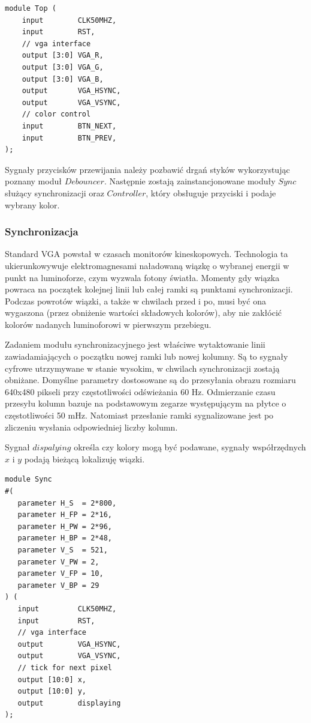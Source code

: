 \documentclass[a4paper,12pt]{article}
\begin{document}
\begin{lstlisting}[label=Topvga,caption=Top.v]
module Top (
    input        CLK50MHZ,
    input        RST,
    // vga interface
    output [3:0] VGA_R,
    output [3:0] VGA_G,
    output [3:0] VGA_B,
    output       VGA_HSYNC,
    output       VGA_VSYNC,
    // color control
    input        BTN_NEXT,
    input        BTN_PREV,
);
\end{lstlisting}

Sygnały przycisków przewijania należy pozbawić drgań styków wykorzystując poznany moduł $Debouncer$. Następnie zostają zainstancjonowane moduły $Sync$ służący synchronizacji oraz $Controller$, który obsługuje przyciski i podaje wybrany kolor.

\subsubsection{Synchronizacja}
Standard VGA powstał w czasach monitorów kineskopowych. Technologia ta ukierunkowywuje elektromagnesami naładowaną wiązkę o wybranej energii w punkt na luminoforze, czym wyzwala fotony światła. Momenty gdy wiązka powraca na początek kolejnej linii lub całej ramki są punktami synchronizacji. Podczas powrotów wiązki, a także w chwilach przed i po, musi być ona wygaszona (przez obniżenie wartości składowych kolorów), aby nie zakłócić kolorów nadanych luminoforowi w pierwszym przebiegu.

Zadaniem modułu synchronizacyjnego jest właściwe wytaktowanie linii zawiadamiających o początku nowej ramki lub nowej kolumny. Są to sygnały cyfrowe utrzymywane w stanie wysokim, w chwilach synchronizacji zostają obniżane. Domyślne parametry dostosowane są do przesyłania obrazu rozmiaru 640x480 pikseli przy częstotliwości odświeżania 60 Hz. Odmierzanie czasu przesyłu kolumn  bazuje na podstawowym zegarze występującym na płytce o częstotliwości 50 mHz. Natomiast przesłanie ramki sygnalizowane jest po zliczeniu wysłania odpowiedniej liczby kolumn.

Sygnał $dispalying$ określa czy kolory mogą być podawane, sygnały współrzędnych $x$ i $y$ podają bieżącą lokalizuję wiązki.

\begin{lstlisting}[label=Syncvga,caption=Sync.v]
module Sync
#(
   parameter H_S  = 2*800,
   parameter H_FP = 2*16,
   parameter H_PW = 2*96,
   parameter H_BP = 2*48,
   parameter V_S  = 521,
   parameter V_PW = 2,
   parameter V_FP = 10,
   parameter V_BP = 29
) (
   input         CLK50MHZ,
   input         RST,
   // vga interface
   output        VGA_HSYNC,
   output        VGA_VSYNC,
   // tick for next pixel
   output [10:0] x,
   output [10:0] y,
   output        displaying
);
\end{lstlisting}
\end{document}
